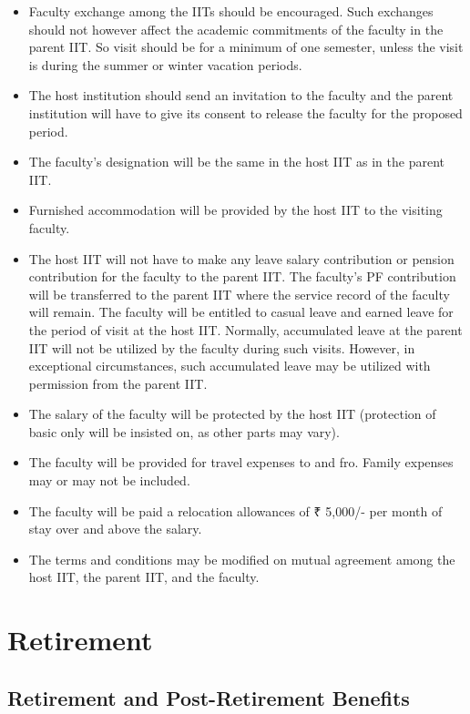 \documentclass[
  10pt,
  a5paper,
  10pt,
  openany]{amsbook}
\providecommand{\tightlist}{%
  \setlength{\itemsep}{0pt}\setlength{\parskip}{0pt}}
\begin{document}
\begin{itemize}
\tightlist
\item
  Faculty exchange among the IITs should be encouraged. Such exchanges
  should not however affect the academic commitments of the faculty in
  the parent IIT. So visit should be for a minimum of one semester,
  unless the visit is during the summer or winter vacation periods.
\item
  The host institution should send an invitation to the faculty and the
  parent institution will have to give its consent to release the
  faculty for the proposed period.
\item
  The faculty's designation will be the same in the host IIT as in the
  parent IIT.
\item
  Furnished accommodation will be provided by the host IIT to the
  visiting faculty.
\item
  The host IIT will not have to make any leave salary contribution or
  pension contribution for the faculty to the parent IIT. The faculty's
  PF contribution will be transferred to the parent IIT where the
  service record of the faculty will remain. The faculty will be
  entitled to casual leave and earned leave for the period of visit at
  the host IIT. Normally, accumulated leave at the parent IIT will not
  be utilized by the faculty during such visits. However, in exceptional
  circumstances, such accumulated leave may be utilized with permission
  from the parent IIT.
\item
  The salary of the faculty will be protected by the host IIT
  (protection of basic only will be insisted on, as other parts may
  vary).
\item
  The faculty will be provided for travel expenses to and fro. Family
  expenses may or may not be included.
\item
  The faculty will be paid a relocation allowances of ₹ 5,000/- per
  month of stay over and above the salary.
\item
  The terms and conditions may be modified on mutual agreement among the
  host IIT, the parent IIT, and the faculty.
\end{itemize}

\part{Retirement}

\chapter{Retirement and Post-Retirement Benefits}\label{sec:retirement}
\end{document}
